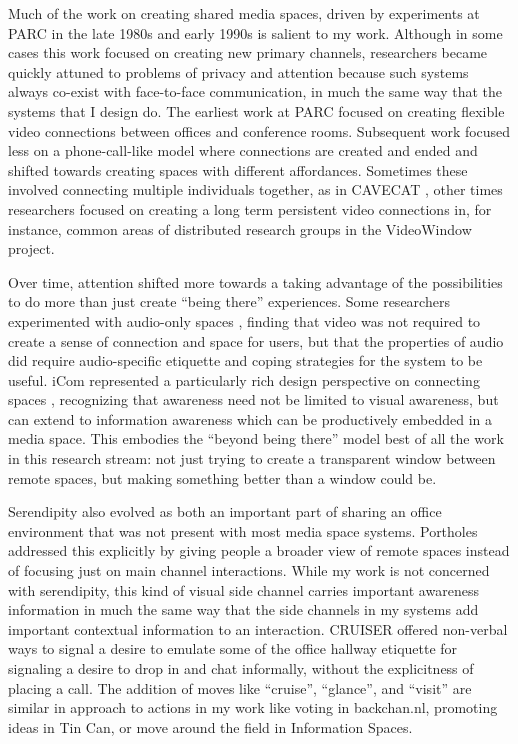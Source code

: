 \documentclass{tufte-handout}
\begin{document}
Much of the work on creating shared media spaces, driven by experiments at PARC in the late 1980s and early 1990s is salient to my work. Although in some cases this work focused on creating new primary channels, researchers became quickly attuned to problems of privacy and attention because such systems always co-exist with face-to-face communication, in much the same way that the systems that I design do. The earliest work at PARC \cite{olsen_bly_portland} focused on creating flexible video connections between offices and conference rooms. Subsequent work focused less on a phone-call-like model where connections are created and ended and shifted towards creating spaces with different affordances. Sometimes these involved connecting multiple individuals together, as in CAVECAT \cite{cavecat}, other times researchers focused on creating a long term persistent video connections in, for instance, common areas of distributed research groups in the VideoWindow project\cite{videowindow}. 

Over time, attention shifted more towards a taking advantage of the possibilities to do more than just create ``being there'' experiences. Some researchers experimented with audio-only spaces \cite{thunderwire}, finding that video was not required to create a sense of connection and space for users, but that the properties of audio did require audio-specific etiquette and coping strategies for the system to be useful. iCom represented a particularly rich design perspective on connecting spaces  \cite{stefan_icom}, recognizing that awareness need not be limited to visual awareness, but can extend to information awareness which can be productively embedded in a media space. This embodies the ``beyond being there'' model best of all the work in this research stream: not just trying to create a transparent window between remote spaces, but making something better than a window could be.

Serendipity also evolved as both an important part of sharing an office environment that was not present with most media space systems. Portholes \cite{portholes} addressed this explicitly by giving people a broader view of remote spaces instead of focusing just on main channel interactions. While my work is not concerned with serendipity, this kind of visual side channel carries important awareness information in much the same way that the side channels in my systems add important contextual information to an interaction. CRUISER \cite{fish_kraut_cruiser} offered non-verbal ways to signal a desire to emulate some of the office hallway etiquette for signaling a desire to drop in and chat informally, without the explicitness of placing a call. The addition of moves like ``cruise'', ``glance'', and ``visit'' are similar in approach to actions in my work like voting in backchan.nl, promoting ideas in Tin Can, or move around the field in Information Spaces. 
\end{document}
